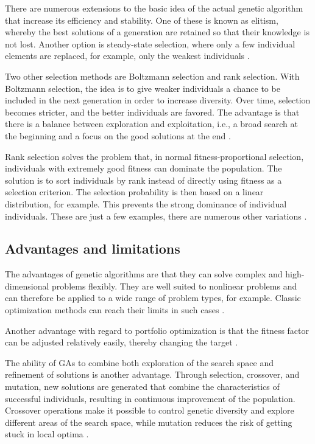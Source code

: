 \documentclass{agasthesis}
\begin{document}
There are numerous extensions to the basic idea of the actual genetic algorithm that increase its efficiency and stability. 
One of these is known as elitism, whereby the best solutions of a generation are retained so that their knowledge is not lost. 
Another option is steady-state selection, where only a few individual elements are replaced, for example, only the weakest individuals \cite[p. 126-128]{melanie_introduction_1999}. 

Two other selection methods are Boltzmann selection and rank selection. With Boltzmann selection, the idea is to give weaker 
individuals a chance to be included in the next generation in order to increase diversity. Over time, selection becomes stricter, 
and the better individuals are favored. The advantage is that there is a balance between exploration and exploitation, i.e., 
a broad search at the beginning and a focus on the good solutions at the end \cite[p. 126-128]{melanie_introduction_1999}.

Rank selection solves the problem that, in normal fitness-proportional selection, individuals with extremely good fitness can dominate the population. 
The solution is to sort individuals by rank instead of directly using fitness as a selection criterion. 
The selection probability is then based on a linear distribution, for example. This prevents the strong dominance of individual individuals. 
These are just a few examples, there are numerous other variations \cite[p. 126-128]{melanie_introduction_1999}.

\subsection{Advantages and limitations}
The advantages of genetic algorithms are that they can solve complex and high-dimensional problems flexibly. 
They are well suited to nonlinear problems and can therefore be applied to a wide range of problem types, for example. 
Classic optimization methods can reach their limits in such cases \cite{melanie_introduction_1999}. 

Another advantage with regard to portfolio optimization is that the fitness factor can be adjusted relatively easily, 
thereby changing the target \cite[p. 206-207]{soldatos_big_2022}. 

The ability of GAs to combine both exploration of the search space and refinement of solutions is another advantage. 
Through selection, crossover, and mutation, new solutions are generated that combine the characteristics of successful individuals, 
resulting in continuous improvement of the population. Crossover operations make it possible to control genetic diversity and explore different 
areas of the search space, while mutation reduces the risk of getting stuck in local optima \cite[p. 8097–8101]{katoch_review_2021}.
\end{document}
